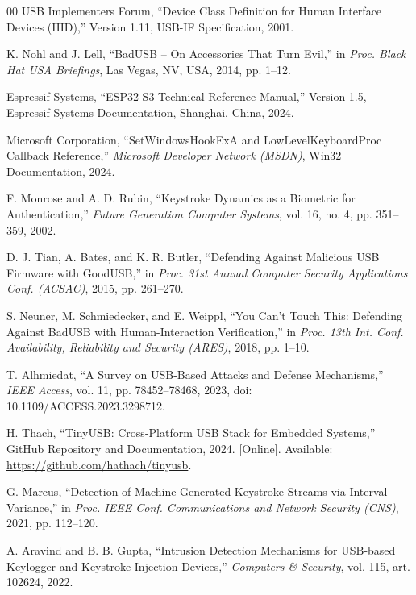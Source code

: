 \documentclass[conference]{IEEEtran}
\begin{document}
\begin{thebibliography}{00}
\setlength{\itemsep}{-0.2pt plus 0.2pt minus 0.2pt}
 USB Implementers Forum, ``Device Class Definition for Human Interface Devices (HID),'' Version 1.11, USB-IF Specification, 2001.

 K. Nohl and J. Lell, ``BadUSB -- On Accessories That Turn Evil,'' in \emph{Proc. Black Hat USA Briefings}, Las Vegas, NV, USA, 2014, pp. 1--12.

 Espressif Systems, ``ESP32-S3 Technical Reference Manual,'' Version 1.5, Espressif Systems Documentation, Shanghai, China, 2024.

 Microsoft Corporation, ``SetWindowsHookExA and LowLevelKeyboardProc Callback Reference,'' \emph{Microsoft Developer Network (MSDN)}, Win32 Documentation, 2024.

 F. Monrose and A. D. Rubin, ``Keystroke Dynamics as a Biometric for Authentication,'' \emph{Future Generation Computer Systems}, vol. 16, no. 4, pp. 351--359, 2002.

 D. J. Tian, A. Bates, and K. R. Butler, ``Defending Against Malicious USB Firmware with GoodUSB,'' in \emph{Proc. 31st Annual Computer Security Applications Conf. (ACSAC)}, 2015, pp. 261--270.

 S. Neuner, M. Schmiedecker, and E. Weippl, ``You Can't Touch This: Defending Against BadUSB with Human-Interaction Verification,'' in \emph{Proc. 13th Int. Conf. Availability, Reliability and Security (ARES)}, 2018, pp. 1--10.

 T. Alhmiedat, ``A Survey on USB-Based Attacks and Defense Mechanisms,'' \emph{IEEE Access}, vol. 11, pp. 78452--78468, 2023, doi: 10.1109/ACCESS.2023.3298712.

 H. Thach, ``TinyUSB: Cross-Platform USB Stack for Embedded Systems,'' GitHub Repository and Documentation, 2024. [Online]. Available: \url{https://github.com/hathach/tinyusb}.

 G. Marcus, ``Detection of Machine-Generated Keystroke Streams via Interval Variance,'' in \emph{Proc. IEEE Conf. Communications and Network Security (CNS)}, 2021, pp. 112--120.

 A. Aravind and B. B. Gupta, ``Intrusion Detection Mechanisms for USB-based Keylogger and Keystroke Injection Devices,'' \emph{Computers \& Security}, vol. 115, art. 102624, 2022.


\end{thebibliography}
\end{document}
